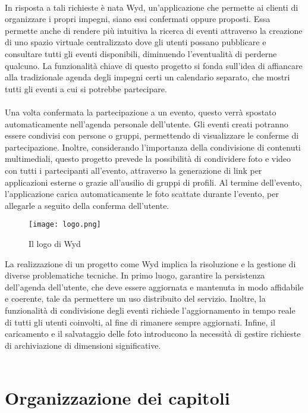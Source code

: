 \\
In risposta a tali richieste è nata Wyd, un'applicazione che permette ai clienti di organizzare i propri impegni, 
siano essi confermati oppure proposti. 
Essa permette anche di rendere più intuitiva la ricerca di eventi attraverso la creazione di uno spazio virtuale centralizzato 
dove gli utenti possano pubblicare e consultare tutti gli eventi disponibili,
diminuendo l’eventualità di perderne qualcuno.
La funzionalità chiave di questo progetto si fonda sull'idea di affiancare alla tradizionale agenda degli impegni certi un calendario separato, 
che mostri tutti gli eventi a cui si potrebbe partecipare. \\
\\
Una volta confermata la partecipazione a un evento, 
questo verrà spostato automaticamente nell'agenda personale dell'utente.
Gli eventi creati potranno essere condivisi con persone o gruppi, 
permettendo di visualizzare le conferme di partecipazione. 
Inoltre, considerando l'importanza della condivisione di contenuti multimediali, 
questo progetto prevede la possibilità di condividere foto e video con tutti i partecipanti all'evento, 
attraverso la generazione di link per applicazioni esterne o grazie all'ausilio di gruppi di profili. 
Al termine dell’evento, l'applicazione carica automaticamente le foto scattate durante l'evento,
per allegarle a seguito della conferma dell'utente.


\begin{figure}[h!]
    \centering
    \texttt{[image: logo.png]}
    \caption{Il logo di Wyd}
\end{figure}	

\clearpage
La realizzazione di un progetto come Wyd implica la risoluzione e la gestione di diverse problematiche tecniche. 
In primo luogo, garantire la persistenza dell'agenda dell'utente, 
che deve essere aggiornata e mantenuta in modo affidabile e coerente, 
tale da permettere un uso distribuito del servizio. 
Inoltre, la funzionalità di condivisione degli eventi richiede l'aggiornamento in tempo reale di tutti gli utenti coinvolti, 
al fine di rimanere sempre aggiornati.
Infine, il caricamento e il salvataggio delle foto introducono la necessità di gestire richieste di archiviazione di dimensioni significative.\\
\\
\section*{Organizzazione dei capitoli}

